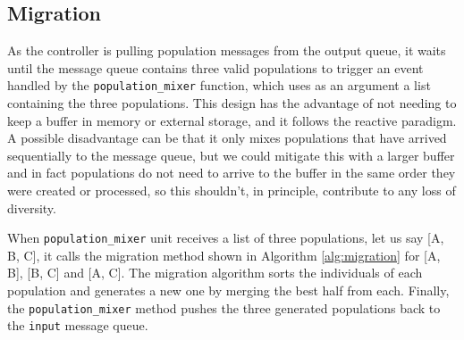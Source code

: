\subsection{Migration}
\label{migration}

As the controller is pulling population messages from the output queue, it waits
until the message queue contains three valid populations to trigger an event handled by the
\texttt{population\_mixer} function, which uses as an argument a list
containing the three populations. This design has the advantage of not needing to keep a
buffer in memory or external storage, and it follows the reactive paradigm. A
possible disadvantage can be that it only mixes populations that have
arrived sequentially to the message queue, but we
could mitigate this with a larger buffer and in fact populations do
not need to arrive to the buffer in the same order they were created
or processed, so this shouldn't, in principle, contribute to any loss
of diversity.

When \texttt{population\_mixer} unit receives a list of three populations, let us say
[A, B, C], it calls the migration method shown in Algorithm \ref{alg:migration}
for [A, B], [B, C] and [A, C]. The migration algorithm sorts the
individuals of each population and generates a new one by
merging the best half from each. Finally, the \texttt{population\_mixer} 
method pushes the three generated populations back to the \texttt{input} message queue.

